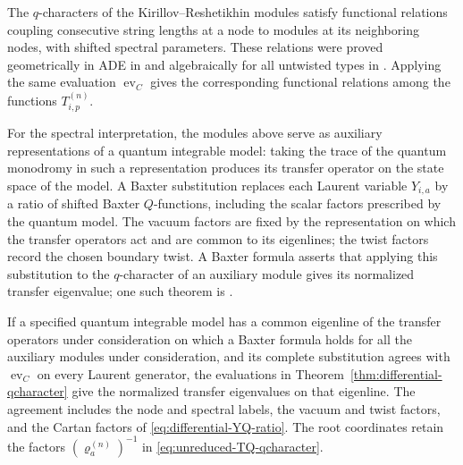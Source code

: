 \documentclass[11pt,leqno]{amsart}
\numberwithin{equation}{section}
\theoremstyle{plain}
\theoremstyle{definition}
\theoremstyle{plain}
\theoremstyle{definition}
\theoremstyle{remark}
\begin{document}
The $q$-characters of the Kirillov--Reshetikhin modules satisfy functional relations coupling consecutive string lengths at a node to modules at its neighboring nodes, with shifted spectral parameters.  These relations were proved geometrically in ADE in \cite[Theorem~1.1]{Nakajima2003} and algebraically for all untwisted types in \cite{Hernandez2006}.  Applying the same evaluation $\operatorname{ev}_C$ gives the corresponding functional relations among the functions $T_{i,p}^{(n)}$.

For the spectral interpretation, the modules above serve as auxiliary representations of a quantum integrable model: taking the trace of the quantum monodromy in such a representation produces its transfer operator on the state space of the model.  A Baxter substitution replaces each Laurent variable $Y_{i,a}$ by a ratio of shifted Baxter $Q$-functions, including the scalar factors prescribed by the quantum model.  The vacuum factors are fixed by the representation on which the transfer operators act and are common to its eigenlines; the twist factors record the chosen boundary twist.  A Baxter formula asserts that applying this substitution to the $q$-character of an auxiliary module gives its normalized transfer eigenvalue; one such theorem is \cite[Theorem~5.11]{FH2015}.

If a specified quantum integrable model has a common eigenline of the transfer operators under consideration on which a Baxter formula holds for all the auxiliary modules under consideration, and its complete substitution agrees with $\operatorname{ev}_C$ on every Laurent generator, the evaluations in Theorem~\ref{thm:differential-qcharacter} give the normalized transfer eigenvalues on that eigenline. The agreement includes the node and spectral labels, the vacuum and twist factors, and the Cartan factors of \eqref{eq:differential-YQ-ratio}. The root coordinates retain the factors $(\varrho_a^{(n)})^{-1}$ in \eqref{eq:unreduced-TQ-qcharacter}.
\end{document}
